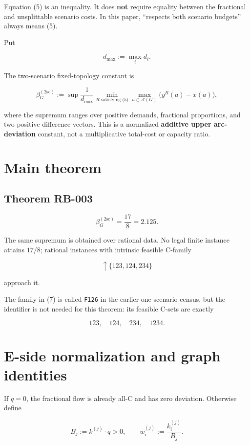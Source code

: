 \documentclass[
  11pt,
]{article}
\begin{document}
Equation (5) is an inequality. It does \textbf{not} require equality
between the fractional and unsplittable scenario costs. In this paper,
``respects both scenario budgets'' always means (5).

Put

\[
d_{\max}:=\max_i d_i.
\]

The two-scenario fixed-topology constant is

\[
\beta_G^{(2\mathrm{sc})}
:=
\sup
\frac1{d_{\max}}
\min_{R\text{ satisfying (5)}}
\max_{a\in\mathcal A(G)}\bigl(y^R(a)-x(a)\bigr),
\tag{6}
\]

where the supremum ranges over positive demands, fractional proportions,
and two positive difference vectors. This is a normalized
\textbf{additive upper arc-deviation} constant, not a multiplicative
total-cost or capacity ratio.

\section{Main theorem}\label{main-theorem}

\subsection{Theorem RB-003}\label{theorem-rb-003}

\[
\boxed{\beta_G^{(2\mathrm{sc})}=\frac{17}{8}=2.125.}
\]

The same supremum is obtained over rational data. No legal finite
instance attains \(17/8\); rational instances with intrinsic feasible
C-family

\[
\uparrow\{123,124,234\}
\tag{7}
\]

approach it.

The family in (7) is called \texttt{F126} in the earlier one-scenario
census, but the identifier is not needed for this theorem: its feasible
C-sets are exactly

\[
123,\quad124,\quad234,\quad1234.
\]

\section{E-side normalization and graph
identities}\label{e-side-normalization-and-graph-identities}

If \(q=0\), the fractional flow is already all-C and has zero deviation.
Otherwise define

\[
B_j:=k^{(j)}\!\cdot q>0,
\qquad
w_i^{(j)}:=\frac{k_i^{(j)}}{B_j}.
\]
\end{document}
